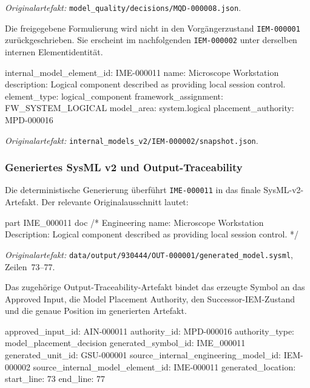 \noindent\textit{Originalartefakt:}
\texttt{model\_quality/decisions/MQD-000008.json}.

Die freigegebene Formulierung wird nicht in den Vorgängerzustand
\texttt{IEM-000001} zurückgeschrieben. Sie erscheint im nachfolgenden
\texttt{IEM-000002} unter derselben internen Elementidentität.

\begin{evidencebox}
internal_model_element_id: IME-000011
name:                      Microscope Workstation
description:               Logical component described as providing local session control.
element_type:              logical_component
framework_assignment:      FW_SYSTEM_LOGICAL
model_area:                system.logical
placement_authority:       MPD-000016
\end{evidencebox}

\noindent\textit{Originalartefakt:}
\texttt{internal\_models\_v2/IEM-000002/snapshot.json}.

\subsubsection{Generiertes SysML v2 und Output-Traceability}

Die deterministische Generierung überführt \texttt{IME-000011} in das finale
SysML-v2-Artefakt. Der relevante Originalausschnitt lautet:

\begin{evidencebox}
part IME_000011 {
    doc /* Engineering name: Microscope Workstation
    Description:
    Logical component described as providing local session control. */
}
\end{evidencebox}

\noindent\textit{Originalartefakt:}
\texttt{data/output/930444/OUT-000001/generated\_model.sysml},
Zeilen~73--77.

Das zugehörige Output-Traceability-Artefakt bindet das erzeugte Symbol an das
Approved Input, die Model Placement Authority, den Successor-IEM-Zustand und
die genaue Position im generierten Artefakt.

\begin{evidencebox}
approved_input_id:                    AIN-000011
authority_id:                         MPD-000016
authority_type:                       model_placement_decision
generated_symbol_id:                  IME_000011
generated_unit_id:                    GSU-000001
source_internal_engineering_model_id: IEM-000002
source_internal_model_element_id:      IME-000011
generated_location:
  start_line: 73
  end_line:   77
\end{evidencebox}

